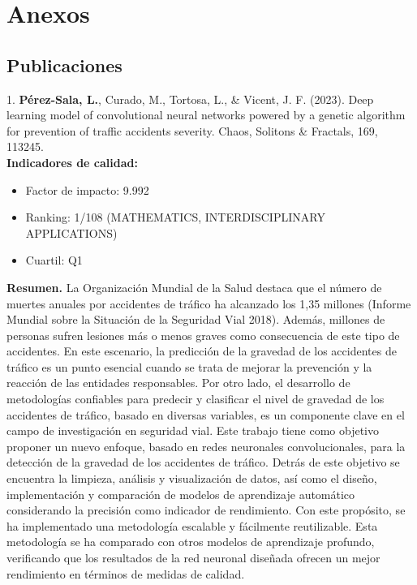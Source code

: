 
\chapter{Anexos}

\section{Publicaciones}
1. \textbf{Pérez-Sala, L.}, Curado, M., Tortosa, L., \& Vicent, J. F. (2023). Deep learning model of convolutional neural networks powered by a genetic algorithm for prevention of traffic accidents severity. Chaos, Solitons \& Fractals, 169, 113245.\\

\textbf{Indicadores de calidad:} 
\begin{itemize}
	\item Factor de impacto: 9.992
	\item Ranking: 1/108 (MATHEMATICS, INTERDISCIPLINARY APPLICATIONS)
	\item Cuartil: Q1
\end{itemize}

\textbf{Resumen.} La Organización Mundial de la Salud destaca que el número de muertes anuales por accidentes de tráfico ha alcanzado los 1,35 millones (Informe Mundial sobre la Situación de la Seguridad Vial 2018). Además, millones de personas sufren lesiones más o menos graves como consecuencia de este tipo de accidentes. En este escenario, la predicción de la gravedad de los accidentes de tráfico es un punto esencial cuando se trata de mejorar la prevención y la reacción de las entidades responsables. Por otro lado, el desarrollo de metodologías confiables para predecir y clasificar el nivel de gravedad de los accidentes de tráfico, basado en diversas variables, es un componente clave en el campo de investigación en seguridad vial. Este trabajo tiene como objetivo proponer un nuevo enfoque, basado en redes neuronales convolucionales, para la detección de la gravedad de los accidentes de tráfico. Detrás de este objetivo se encuentra la limpieza, análisis y visualización de datos, así como el diseño, implementación y comparación de modelos de aprendizaje automático considerando la precisión como indicador de rendimiento.
Con este propósito, se ha implementado una metodología escalable y fácilmente reutilizable. Esta metodología se ha comparado con otros modelos de aprendizaje profundo, verificando que los resultados de la red neuronal diseñada ofrecen un mejor rendimiento en términos de medidas de calidad.\\


